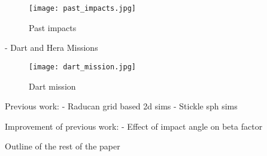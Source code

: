 \begin{figure}[H]
    \centering
    \texttt{[image: past\_impacts.jpg]}
    \caption{Past impacts \cite{image:past_impacts}}
    \label{fig:past_impacts}
\end{figure}

- Dart and Hera Missions

\begin{figure}[H]
    \centering
    \texttt{[image: dart\_mission.jpg]}
    \caption{Dart mission \cite{image:dart_mission}}
    \label{fig:dart_mission}
\end{figure}

Previous work:
- Raducan \cite{Raducan_2019_strength} grid based 2d sims
- Stickle \cite{Stickle_2017} sph sims

Improvement of previous work:
- Effect of impact angle on beta factor

Outline of the rest of the paper